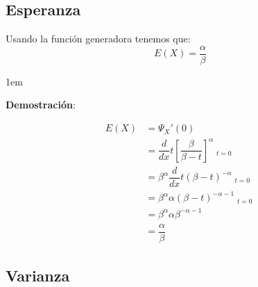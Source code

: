 \documentclass[12pt, fleqn]{report}                             %
\newenvironment{SmallIndentation}[1][0.75em]                    %
        {\begin{adjustwidth}{#1}{}\begin{footnotesize}}             %
        {\end{footnotesize}\end{adjustwidth}}                       %
\theoremstyle{break}                                            %
\newcommand{\Wrap}[1]           {\left( #1 \right)}             %
\newcommand{\Brackets}[1]       {\left[ #1 \right]}             %
\newcommand \MiniDerivate[1][x]   {\dfrac{d}{d #1}}             %
\DeclareMathOperator \Evaluate  {\Big|}                         %
\begin{document}
            \clearpage
            \subsection{Esperanza}

                Usando la función generadora tenemos que:
                \begin{equation*}
                    E(X) = \dfrac{\alpha}{\beta}
                \end{equation*}

                \begin{SmallIndentation}[1em]
                    \textbf{Demostración}:
                    
                    \begin{align*}
                        E(X)
                            &= \Psi_X'(0)                                                                           \\
                            &= \MiniDerivate{t} \Brackets{\dfrac{\beta}{\beta - t}}^\alpha \Evaluate_{t = 0}        \\
                            &= \beta^\alpha \MiniDerivate{t} \Wrap{\beta - t}^{-\alpha} \Evaluate_{t = 0}           \\
                            &= \beta^\alpha \alpha(\beta - t)^{-\alpha - 1} \Evaluate_{t = 0}                       \\
                            &= \beta^\alpha \alpha \beta^{-\alpha - 1}                                              \\
                            &= \dfrac{\alpha}{\beta}
                    \end{align*}
                
                \end{SmallIndentation}



            \subsection{Varianza}
\end{document}
